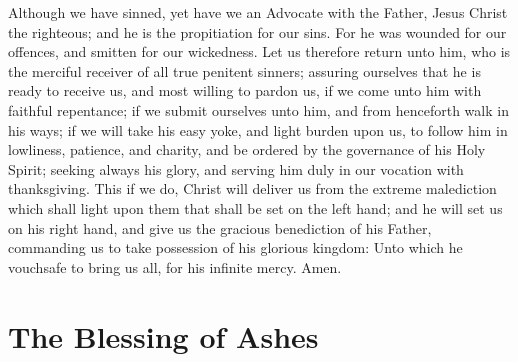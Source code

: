 Although we have sinned, yet have we an Advocate with the Father, Jesus Christ the righteous; and he is the propitiation for our sins. For he was wounded for our offences, and smitten for our wickedness. Let us therefore return unto him, who is the merciful receiver of all true penitent sinners; assuring ourselves that he is ready to receive us, and most willing to pardon us, if we come unto him with faithful repentance; if we submit ourselves unto him, and from henceforth walk in his ways; if we will take his easy yoke, and light burden upon us, to follow him in lowliness, patience, and charity, and be ordered by the governance of his Holy Spirit; seeking always his glory, and serving him duly in our vocation with thanksgiving. This if we do, Christ will deliver us from the extreme malediction which shall light upon them that shall be set on the left hand; and he will set us on his right hand, and give us the gracious benediction of his Father, commanding us to take possession of his glorious kingdom: Unto which he vouchsafe to bring us all, for his infinite mercy. Amen.


\medskip


\section{The Blessing of Ashes}

